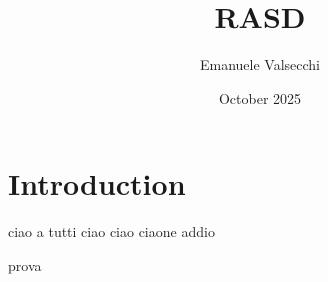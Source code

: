 \documentclass{article}
\title{RASD}
\author{Emanuele Valsecchi}
\date{October 2025}
\begin{document}
\maketitle

\section{Introduction}

ciao a tutti
ciao ciao
ciaone
addio


prova
\end{document}
